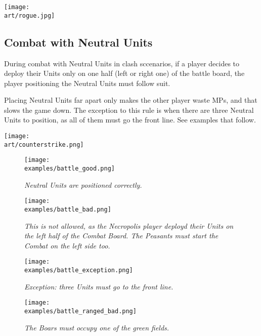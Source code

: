 \begin{multicols}{2}
\texttt{[image: \\art/rogue.jpg]}

\subsection*{Combat with Neutral Units}

During combat with Neutral Units in clash sccenarios, if a player decides to deploy their Units only on one half (left or right one) of the battle board, the player positioning the Neutral Units must follow suit.

Placing Neutral Units far apart only makes the other player waste MPs, and that slows the game down.
The exception to this rule is when there are three Neutral  Units to position, as all of them must go the front line.
See examples that follow.

\begin{center}
  \texttt{[image: \\art/counterstrike.png]}
\end{center}

\end{multicols}

\begin{figure*}[!h]
  \mbox{}%
  \hfill%
  \begin{minipage}[t]{0.44\textwidth}
    \centering
    \texttt{[image: \\examples/battle\_good.png]}
    \caption[good protected]{\textit{Neutral Units are positioned correctly.}}
  \end{minipage}
  \hfill%
  \begin{minipage}[t]{0.44\textwidth}
    \centering
    \texttt{[image: \\examples/battle\_bad.png]}
    \caption[bad protected]{\textit{This is not allowed, as the Necropolis player deployd their Units on the left half of the Combat Board.
      The Peasants must start the Combat on the left side too.}}
  \end{minipage}
  \hfill%
  \mbox{}%
\end{figure*}

\clearpage

\begin{figure*}[!h]
  \mbox{}%
  \hfill%
  \begin{minipage}[t]{0.44\textwidth}
    \centering
    \texttt{[image: \\examples/battle\_exception.png]}
    \caption[exception protected]{\textit{Exception: three  Units must go to the front line.}}
  \end{minipage}
  \hfill%
  \begin{minipage}[t]{0.44\textwidth}
    \centering
    \texttt{[image: \\examples/battle\_ranged\_bad.png]}
    \caption[ranged protected]{\textit{The Boars must occupy one of the green fields.}}
  \end{minipage}
  \hfill%
  \mbox{}%
\end{figure*}

